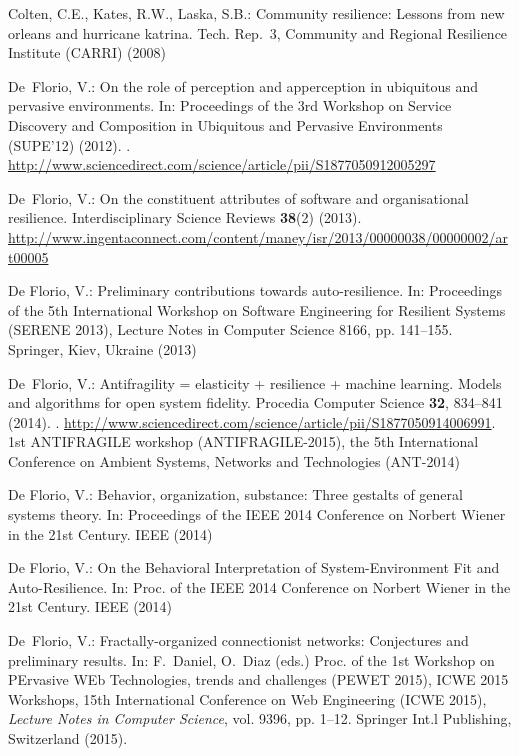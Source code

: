 \documentclass[twocolumn]{svjour3}
\begin{document}
\begin{thebibliography}{10}
Colten, C.E., Kates, R.W., Laska, S.B.: Community resilience: Lessons from new
  orleans and hurricane katrina.
\newblock Tech. Rep.~3, Community and Regional Resilience Institute (CARRI)
  (2008)

De~Florio, V.: On the role of perception and apperception in ubiquitous and
  pervasive environments.
\newblock In: Proceedings of the 3rd Workshop on Service Discovery and
  Composition in Ubiquitous and Pervasive Environments (SUPE'12) (2012).
\newblock {}.
\newblock
  \urlprefix\url{http://www.sciencedirect.com/science/article/pii/S1877050912005297}

{De~Florio}, V.: On the constituent attributes of software and organisational
  resilience.
\newblock Interdisciplinary Science Reviews \textbf{38}(2) (2013).
\newblock
  \urlprefix\url{http://www.ingentaconnect.com/content/maney/isr/2013/00000038/00000002/art00005}

{De Florio}, V.: Preliminary contributions towards auto-resilience.
\newblock In: Proceedings of the 5th International Workshop on Software
  Engineering for Resilient Systems (SERENE 2013), Lecture Notes in Computer
  Science 8166, pp. 141--155. Springer, Kiev, Ukraine (2013)

{De~Florio}, V.: Antifragility = elasticity + resilience + machine learning.
  {Models} and algorithms for open system fidelity.
\newblock Procedia Computer Science \textbf{32}, 834--841 (2014).
\newblock {}.
\newblock
  \urlprefix\url{http://www.sciencedirect.com/science/article/pii/S1877050914006991}.
\newblock 1st ANTIFRAGILE workshop (ANTIFRAGILE-2015), the 5th International
  Conference on Ambient Systems, Networks and Technologies (ANT-2014)

{De Florio}, V.: Behavior, organization, substance: Three gestalts of general
  systems theory.
\newblock In: Proceedings of the IEEE 2014 Conference on Norbert Wiener in the
  21st Century. IEEE (2014)

{De Florio}, V.: {On the Behavioral Interpretation of System-Environment Fit
  and Auto-Resilience}.
\newblock In: Proc. of the {IEEE} 2014 Conference on {N}orbert {W}iener in the
  21st Century. IEEE (2014)

{De~Florio}, V.: Fractally-organized connectionist networks: Conjectures and
  preliminary results.
\newblock In: F.~Daniel, O.~Diaz (eds.) Proc. of the 1st Workshop on PErvasive
  WEb Technologies, trends and challenges (PEWET 2015), ICWE 2015 Workshops,
  15th International Conference on Web Engineering (ICWE 2015), \emph{Lecture
  Notes in Computer Science}, vol. 9396, pp. 1--12. Springer Int.l Publishing,
  Switzerland (2015).
\newblock {}


\end{thebibliography}
\end{document}
